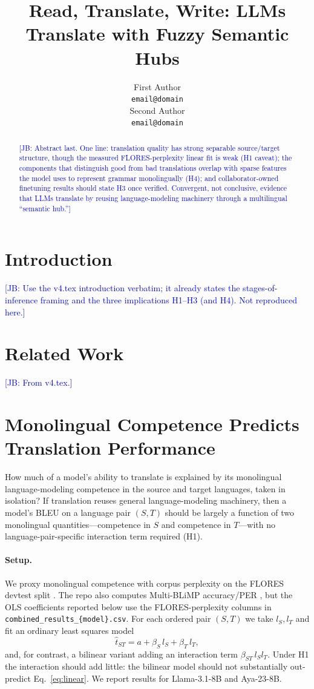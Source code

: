 \documentclass[11pt]{article}
\title{Read, Translate, Write: LLMs Translate with Fuzzy Semantic Hubs}
\author{First Author \\ \texttt{email@domain} \\\And Second Author \\ \texttt{email@domain}}
\newcommand{\jb}[1]{\textcolor{blue}{[JB: #1]}} %
\begin{document}
\maketitle
\begin{abstract}
\jb{Abstract last. One line: translation quality has strong separable
source/target structure, though the measured FLORES-perplexity linear fit is
weak (H1 caveat); the components that distinguish good from bad translations
overlap with sparse features the model uses to represent grammar monolingually
(H4); and collaborator-owned finetuning results should state H3 once verified.
Convergent, not conclusive, evidence that LLMs translate by reusing
language-modeling machinery through a multilingual ``semantic hub.''}
\end{abstract}

\section{Introduction}
\jb{Use the v4.tex introduction verbatim; it already states the stages-of-inference
framing and the three implications H1--H3 (and H4). Not reproduced here.}

\section{Related Work}
\jb{From v4.tex.}

\section{Monolingual Competence Predicts Translation Performance}
\label{sec:linear}

How much of a model's ability to translate is explained by its monolingual
language-modeling competence in the source and target languages, taken in
isolation? If translation reuses general language-modeling machinery, then a
model's BLEU on a language pair $(S,T)$ should be largely a function of two
monolingual quantities---competence in $S$ and competence in $T$---with no
language-pair-specific interaction term required (H1).

\paragraph{Setup.} We proxy monolingual competence with corpus perplexity on the
FLORES devtest split \citep{goyal2022flores}. The repo also computes
Multi-BLiMP accuracy/PER \citep{jumelet2025multiblimp}, but the OLS coefficients
reported below use the FLORES-perplexity columns in
\texttt{combined\_results\_\{model\}.csv}. For each ordered pair $(S,T)$ we take
$l_S, l_T$ and fit an ordinary least squares model
\begin{equation}
\hat{t}_{ST} = a + \beta_S\, l_S + \beta_T\, l_T,
\label{eq:linear}
\end{equation}
and, for contrast, a bilinear variant adding an interaction term
$\beta_{ST}\, l_S l_T$. Under H1 the interaction should add little: the bilinear
model should not substantially out-predict Eq.~\ref{eq:linear}. We report
results for Llama-3.1-8B and Aya-23-8B.
\end{document}

